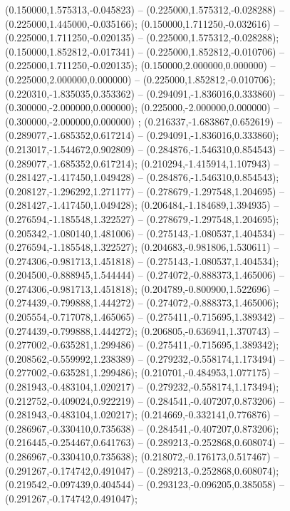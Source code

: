  (0.150000,1.575313,-0.045823) -- (0.225000,1.575312,-0.028288) -- (0.225000,1.445000,-0.035166);
 (0.150000,1.711250,-0.032616) -- (0.225000,1.711250,-0.020135) -- (0.225000,1.575312,-0.028288);
 (0.150000,1.852812,-0.017341) -- (0.225000,1.852812,-0.010706) -- (0.225000,1.711250,-0.020135);
 (0.150000,2.000000,0.000000) -- (0.225000,2.000000,0.000000) -- (0.225000,1.852812,-0.010706);
 (0.220310,-1.835035,0.353362) -- (0.294091,-1.836016,0.333860) -- (0.300000,-2.000000,0.000000);
 (0.225000,-2.000000,0.000000) -- (0.300000,-2.000000,0.000000) ;
 (0.216337,-1.683867,0.652619) -- (0.289077,-1.685352,0.617214) -- (0.294091,-1.836016,0.333860);
 (0.213017,-1.544672,0.902809) -- (0.284876,-1.546310,0.854543) -- (0.289077,-1.685352,0.617214);
 (0.210294,-1.415914,1.107943) -- (0.281427,-1.417450,1.049428) -- (0.284876,-1.546310,0.854543);
 (0.208127,-1.296292,1.271177) -- (0.278679,-1.297548,1.204695) -- (0.281427,-1.417450,1.049428);
 (0.206484,-1.184689,1.394935) -- (0.276594,-1.185548,1.322527) -- (0.278679,-1.297548,1.204695);
 (0.205342,-1.080140,1.481006) -- (0.275143,-1.080537,1.404534) -- (0.276594,-1.185548,1.322527);
 (0.204683,-0.981806,1.530611) -- (0.274306,-0.981713,1.451818) -- (0.275143,-1.080537,1.404534);
 (0.204500,-0.888945,1.544444) -- (0.274072,-0.888373,1.465006) -- (0.274306,-0.981713,1.451818);
 (0.204789,-0.800900,1.522696) -- (0.274439,-0.799888,1.444272) -- (0.274072,-0.888373,1.465006);
 (0.205554,-0.717078,1.465065) -- (0.275411,-0.715695,1.389342) -- (0.274439,-0.799888,1.444272);
 (0.206805,-0.636941,1.370743) -- (0.277002,-0.635281,1.299486) -- (0.275411,-0.715695,1.389342);
 (0.208562,-0.559992,1.238389) -- (0.279232,-0.558174,1.173494) -- (0.277002,-0.635281,1.299486);
 (0.210701,-0.484953,1.077175) -- (0.281943,-0.483104,1.020217) -- (0.279232,-0.558174,1.173494);
 (0.212752,-0.409024,0.922219) -- (0.284541,-0.407207,0.873206) -- (0.281943,-0.483104,1.020217);
 (0.214669,-0.332141,0.776876) -- (0.286967,-0.330410,0.735638) -- (0.284541,-0.407207,0.873206);
 (0.216445,-0.254467,0.641763) -- (0.289213,-0.252868,0.608074) -- (0.286967,-0.330410,0.735638);
 (0.218072,-0.176173,0.517467) -- (0.291267,-0.174742,0.491047) -- (0.289213,-0.252868,0.608074);
 (0.219542,-0.097439,0.404544) -- (0.293123,-0.096205,0.385058) -- (0.291267,-0.174742,0.491047);
